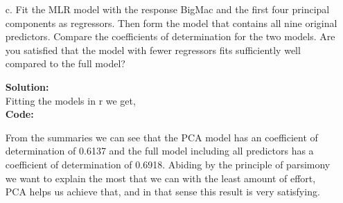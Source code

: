 \documentclass[12pt]{article}
\makeatletter
\theoremstyle{homework}
\newenvironment{exercise}[1]
{\def\@currentlabel{#1}\exercisecore}
{\endexercisecore}
\newcommand{\localhead}[1]{\par\smallskip\noindent\textbf{#1}\nobreak\\}%
\newcommand\solution{\localhead{Solution:}}
\makeatother
\begin{document}
\begin{exercise}{3}
\begin{enumerate}
    \item[c.] Fit the MLR model with the response BigMac and the first four principal components as regressors. Then form the model that 
    contains all nine original predictors. Compare the coefficients of determination for the two models. Are you satisfied that the model with fewer 
    regressors fits sufficiently well compared to the full model?\\
    \solution Fitting the models in r we get, \\
    \textbf{Code:}
    \begin{center}
    
    \end{center} 
    From the summaries we can see that the PCA model has an coefficient of determination of 0.6137 and the full model including all predictors has 
    a coefficient of determination of 0.6918. Abiding by the principle of parsimony we want to explain the most that we can with the least amount of effort, 
    PCA helps us achieve that, and in that sense this result is very satisfying. 
  \end{enumerate}
  
\end{exercise}
\end{document}
